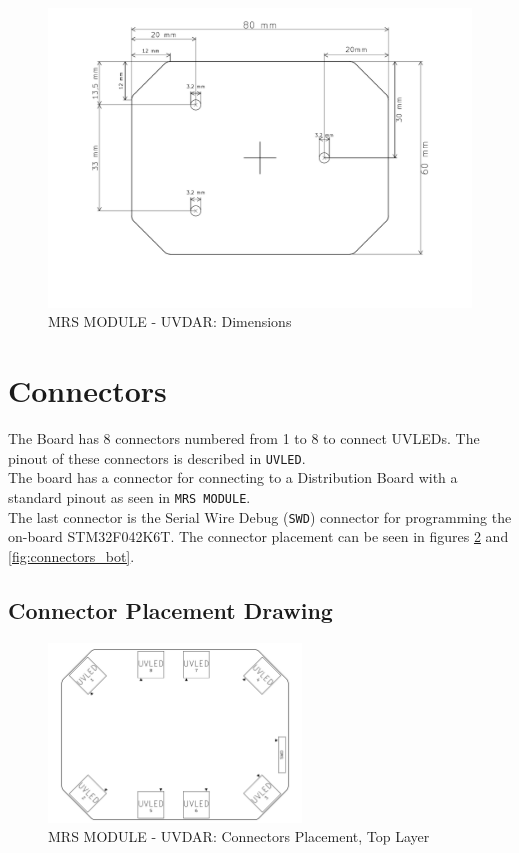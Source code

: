\documentclass[12pt, a4paper]{article}
\begin{document}
\begin{figure}[h]
\centering
\includegraphics[width=\textwidth]{figures/Dimensions.pdf}
\caption{MRS MODULE - UVDAR: Dimensions}
\label{fig:dimensions}
\end{figure}

\pagebreak
\section{Connectors}
The Board has 8 connectors numbered from 1 to 8 to connect UVLEDs. The pinout of these connectors is described in \verb|UVLED|.\\
The board has a connector for connecting to a Distribution Board with a standard pinout as seen in \verb|MRS MODULE|.\\
The last connector is the Serial Wire Debug (\verb|SWD|) connector for programming the on-board STM32F042K6T.
The connector placement can be seen in figures \ref{fig:connectors_top} and \ref{fig:connectors_bot}.
\subsection{Connector Placement Drawing}
\begin{figure}[h]
\centering
\includegraphics[clip=true,width=0.6\textwidth]{figures/Connectors_top.pdf}
\caption{MRS MODULE - UVDAR: Connectors Placement, Top Layer}
\label{fig:connectors_top}
\end{figure}
\end{document}
